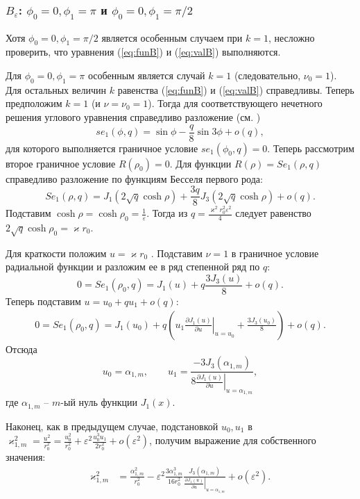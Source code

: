 \subsubsection{$B_\varepsilon$: $\phi_0=0, \phi_1=\pi$ и $\phi_0=0, \phi_1=\pi/2$}\label{sec:ch2/sec4/subs3/subs2}


Хотя $\phi_0=0, \phi_1=\pi/2$ является особенным случаем при $k=1$,
несложно проверить, что уравнения (\ref{eq:funB}) и (\ref{eq:valB}) выполняются.

Для  $\phi_0=0, \phi_1=\pi$
особенным является случай  $k=1$ (следовательно, $\nu_0=1$). 
Для остальных величин $k$ равенства (\ref{eq:funB}) и (\ref{eq:valB}) справедливы.
Теперь предположим $k=1$ (и $\nu=\nu_0 = 1$).
Тогда для соответствующего нечетного решения углового уравнения справедливо разложение  (см. \cite[Subsect.~20.2.27]{wref2})
\begin{equation*}
se_1(\phi, q) = 	\sin{\phi}  - 	\frac{q}{8} \sin{3\phi} + o(q),
 \end{equation*}
для которого выполняется граничное условие $se_1(\phi_0, q)=0$. 
Теперь рассмотрим второе граничное условие $R(\rho_0) = 0$. 
Для функции $R(\rho) = Se_1(\rho, q)$ справедливо разложение по функциям Бесселя первого рода:
\begin{equation*}
Se_1(\rho, q) = J_1(2\sqrt{q} \cosh{\rho}) + \frac{3 q}{8} J_3(2\sqrt{q}\cosh{\rho}) + o(q).
\end{equation*}
Подставим $\cosh \rho = \cosh \rho_0 =\frac{1}{\varepsilon}$.
Тогда из $q = \frac{\varkappa^2 r_0^2 \varepsilon^2}{4}$ следует равенство
$2\sqrt{q} \cosh{\rho_0} =  \varkappa r_0$.

Для краткости положим $u = \varkappa r_0$ .
Подставим $\nu = 1$ в граничное условие радиальной функции и разложим ее в ряд степенной ряд по $q$:
\begin{equation*}
    0 = Se_1(\rho_0, q) = 
    J_1(u) + q  \frac{3 J_3(u)}{8} + o(q).
\end{equation*}
Теперь подставим $u = u_0 + q u_1 + o(q)$:
\begin{align*}
    0 = Se_1(\rho_0, q) =    J_1(u_0) + q \left( 
    u_1 \left.\frac{\partial J_1 (u)}{\partial u}\right|_{u=u_0}
    + \frac{3 J_3(u_0)}{8}
    \right) + o(q).
\end{align*}
Отсюда 
\begin{equation*}
u_0 = \alpha_{1, m}, \qquad u_1 = 
\frac{ - 3 J_3(\alpha_{1, m}) }{8\left.
\frac{\partial J_1 (u)}{\partial u}\right|_{u=\alpha_{1, m}}},
\end{equation*}
где $\alpha_{1, m}$ -- $m$-ый нуль функции $J_1(x)$. 

Наконец, как в предыдущем случае, подстановкой $u_0, u_1$ в $\varkappa_{1, m}^2 = \frac{u^2}{r_0^2} = \frac{u_0^2}{r_0^2} + \varepsilon^2 \frac{u_0^3 u_1}{2r_0^2} + o(\varepsilon^2)$, получим выражение для собственного значения:
\begin{align}
    \varkappa_{1, m}^2& = \frac{\alpha_{1, m}^2}{r_0^2} - \varepsilon^2 \frac{3\alpha_{1, m}^3}{16r_0^2} 
    \frac{J_3(\alpha_{1, m})}{\left.\frac{\partial J_1 (u)}{\partial u}\right|_{u=\alpha_{1, m}}} 
    + o(\varepsilon^2).  \label{eq:valS2}
\end{align}



\FloatBarrier
